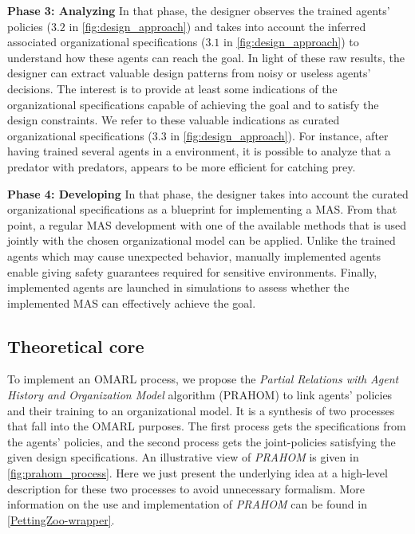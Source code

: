 \documentclass[runningheads]{llncs}
\begin{document}
\textbf{Phase 3: Analyzing} \quad In that phase, the designer observes the trained agents' policies ($3.2$ in \autoref{fig:design_approach}) and takes into account the inferred associated organizational specifications ($3.1$ in \autoref{fig:design_approach}) to understand how these agents can reach the goal. In light of these raw results, the designer can extract valuable design patterns from noisy or useless agents' decisions. The interest is to provide at least some indications of the organizational specifications capable of achieving the goal and to satisfy the design constraints. We refer to these valuable indications as curated organizational specifications ($3.3$ in \autoref{fig:design_approach}). For instance, after having trained several agents in a  environment, it is possible to analyze that a  predator with  predators, appears to be more efficient for catching prey.

\textbf{Phase 4: Developing} \quad In that phase, the designer takes into account the curated organizational specifications as a blueprint for implementing a MAS. From that point, a regular MAS development with one of the available methods that is used jointly with the chosen organizational model can be applied. Unlike the trained agents which may cause unexpected behavior, manually implemented agents enable giving safety guarantees required for sensitive environments. Finally, implemented agents are launched in simulations to assess whether the implemented MAS can effectively achieve the goal.

\subsection{Theoretical core}

To implement an OMARL process, we propose the \emph{Partial Relations with Agent History and Organization Model} algorithm (PRAHOM) to link agents' policies and their training to an organizational model.
It is a synthesis of two processes that fall into the OMARL purposes. The first process gets the specifications from the agents' policies, and the second process gets the joint-policies satisfying the given design specifications. An illustrative view of \emph{PRAHOM} is given in \autoref{fig:prahom_process}.
Here we just present the underlying idea at a high-level description for these two processes to avoid unnecessary formalism. More information on the use and implementation of \emph{PRAHOM} can be found in \autoref{PettingZoo-wrapper}.
\end{document}
